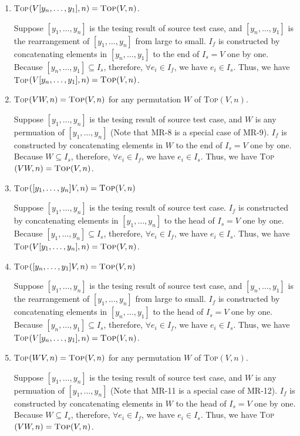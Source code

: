 \documentclass[conference]{IEEEtran}
\theoremstyle{remark}
\newcommand{\Fn}{\textsc{Top}}
\newcommand{\MR}{\textit{MR}}
\begin{document}
\begin{enumerate}[\MR-1]
\item \Fn$(V[y_n,\ldots,y_1],n)=\Fn(V,n)$.

Suppose $[y_1, \ldots, y_n]$ is the tesing result of source test case, and $[y_n, \ldots, y_1]$ is the rearrangement of $[y_1, \ldots, y_n]$ from large to small. $I_f$ is constructed by concatenating elements in $[y_n, \ldots, y_1]$ to the end of $I_s = V$ one by one. Because $[y_n, \ldots, y_1] \subseteq I_s$, therefore, $\forall e_i \in I_f$, we have $e_i \in I_s$. Thus, we have \Fn$(V[y_n, \ldots, y_1],n)=\Fn(V,n)$.

\item \Fn$(VW,n)=\Fn(V,n)$ for any permutation $W$ of \Fn$(V,n)$.

Suppose $[y_1, \ldots, y_n]$ is the tesing result of source test case, and $W$ is any permuation of $[y_1, \ldots, y_n]$ (Note that MR-8 is a special case of MR-9). $I_f$ is constructed by concatenating elements in $W$ to the end of $I_s = V$ one by one. Because $W \subseteq I_s$, therefore, $\forall e_i \in I_f$, we have $e_i \in I_s$. Thus, we have \Fn$(VW,n)=\Fn(V,n)$.

\item \Fn$([y_1,\ldots,y_n]V,n)=\Fn(V,n)$

Suppose $[y_1, \ldots, y_n]$ is the tesing result of source test case. $I_f$ is constructed by concatenating elements in $[y_1, \ldots, y_n]$ to the head of $I_s = V$ one by one. Because $[y_1, \ldots, y_n] \subseteq I_s$, therefore, $\forall e_i \in I_f$, we have $e_i \in I_s$. Thus, we have \Fn$(V[y_1, \ldots, y_n],n)=\Fn(V,n)$.

\item \Fn$([y_n,\ldots,y_1]V,n)=\Fn(V,n)$

Suppose $[y_1, \ldots, y_n]$ is the tesing result of source test case, and $[y_n, \ldots, y_1]$ is the rearrangement of $[y_1, \ldots, y_n]$ from large to small. $I_f$ is constructed by concatenating elements in $[y_n, \ldots, y_1]$ to the head of $I_s = V$ one by one. Because $[y_n, \ldots, y_1] \subseteq I_s$, therefore, $\forall e_i \in I_f$, we have $e_i \in I_s$. Thus, we have \Fn$(V[y_n, \ldots, y_1],n)=\Fn(V,n)$.

\item \Fn$(WV,n)=\Fn(V,n)$ for any permutation $W$ of \Fn$(V,n)$.

Suppose $[y_1, \ldots, y_n]$ is the tesing result of source test case, and $W$ is any permuation of $[y_1, \ldots, y_n]$ (Note that MR-11 is a special case of MR-12). $I_f$ is constructed by concatenating elements in $W$ to the head of $I_s = V$ one by one. Because $W \subseteq I_s$, therefore, $\forall e_i \in I_f$, we have $e_i \in I_s$. Thus, we have \Fn$(VW,n)=\Fn(V,n)$.
\end{enumerate}
\end{document}
